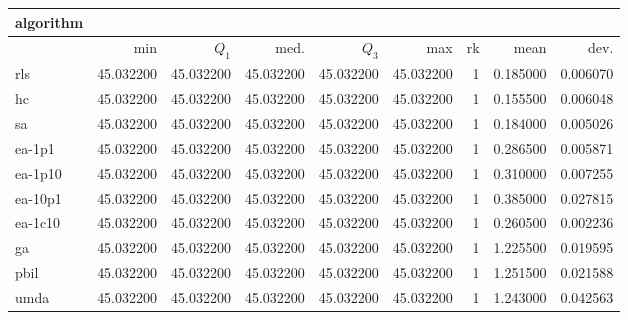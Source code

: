 \begin{tabular}{@{}l*{5}{>{{}}N{2}{2}}>{{}}N{2}{0}N{1}{3}N{1}{3}@{}}
\toprule
{algorithm} &  &  \\
\midrule
& {min} & {$Q_1$} & {med.} & {$Q_3$} & {max} & {rk} & {mean} & {dev.} \\
\midrule
rls & {\color{blue}} 45.032200 & {\color{blue}} 45.032200 & {\color{blue}} 45.032200 & {\color{blue}} 45.032200 & {\color{blue}} 45.032200 & 1 & 0.185000 & 0.006070 \\
 hc & {\color{blue}} 45.032200 & {\color{blue}} 45.032200 & {\color{blue}} 45.032200 & {\color{blue}} 45.032200 & {\color{blue}} 45.032200 & 1 & 0.155500 & 0.006048 \\
 sa & {\color{blue}} 45.032200 & {\color{blue}} 45.032200 & {\color{blue}} 45.032200 & {\color{blue}} 45.032200 & {\color{blue}} 45.032200 & 1 & 0.184000 & 0.005026 \\
 ea-1p1 & {\color{blue}} 45.032200 & {\color{blue}} 45.032200 & {\color{blue}} 45.032200 & {\color{blue}} 45.032200 & {\color{blue}} 45.032200 & 1 & 0.286500 & 0.005871 \\
 ea-1p10 & {\color{blue}} 45.032200 & {\color{blue}} 45.032200 & {\color{blue}} 45.032200 & {\color{blue}} 45.032200 & {\color{blue}} 45.032200 & 1 & 0.310000 & 0.007255 \\
 ea-10p1 & {\color{blue}} 45.032200 & {\color{blue}} 45.032200 & {\color{blue}} 45.032200 & {\color{blue}} 45.032200 & {\color{blue}} 45.032200 & 1 & 0.385000 & 0.027815 \\
 ea-1c10 & {\color{blue}} 45.032200 & {\color{blue}} 45.032200 & {\color{blue}} 45.032200 & {\color{blue}} 45.032200 & {\color{blue}} 45.032200 & 1 & 0.260500 & 0.002236 \\
 ga & {\color{blue}} 45.032200 & {\color{blue}} 45.032200 & {\color{blue}} 45.032200 & {\color{blue}} 45.032200 & {\color{blue}} 45.032200 & 1 & 1.225500 & 0.019595 \\
 pbil & {\color{blue}} 45.032200 & {\color{blue}} 45.032200 & {\color{blue}} 45.032200 & {\color{blue}} 45.032200 & {\color{blue}} 45.032200 & 1 & 1.251500 & 0.021588 \\
 umda & {\color{blue}} 45.032200 & {\color{blue}} 45.032200 & {\color{blue}} 45.032200 & {\color{blue}} 45.032200 & {\color{blue}} 45.032200 & 1 & 1.243000 & 0.042563 \\
 \bottomrule
\end{tabular}
